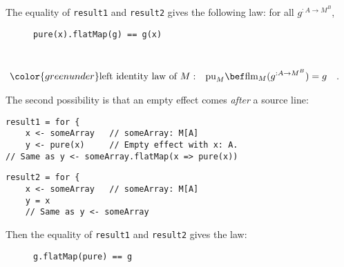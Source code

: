 \noindent \vspace{0.1\baselineskip}
The equality of \lstinline!result1! and \lstinline!result2! gives
the following law: for all $g^{:A\rightarrow M^{B}}$,

\begin{wrapfigure}{l}{0.3\columnwidth}%
\vspace{-0.9\baselineskip}
\begin{lstlisting}
pure(x).flatMap(g) == g(x)
\end{lstlisting}
\vspace{-0.6\baselineskip}
\end{wrapfigure}%

~\vspace{-1.4\baselineskip}
\begin{align}
{\color{greenunder}\text{left identity law of }M:}\quad & \text{pu}_{M}\bef\text{flm}_{M}(g^{:A\rightarrow M^{B}})=g\quad.\label{eq:monad-left-identity-law-for-flatMap}
\end{align}
\vspace{-1.2\baselineskip}

The second possibility is that an empty effect comes \emph{after}
a source line:

\noindent \texttt{\textcolor{blue}{\footnotesize{}}}%
\begin{minipage}[c]{0.475\columnwidth}%
\texttt{\textcolor{blue}{\footnotesize{}}}
\begin{lstlisting}
result1 = for {
    x <- someArray   // someArray: M[A]
    y <- pure(x)     // Empty effect with x: A.
// Same as y <- someArray.flatMap(x => pure(x))
\end{lstlisting}
%
\end{minipage}\texttt{\textcolor{blue}{\footnotesize{}\hspace*{\fill}}}%
\begin{minipage}[c]{0.475\columnwidth}%
\texttt{\textcolor{blue}{\footnotesize{}}}
\begin{lstlisting}
result2 = for {
    x <- someArray   // someArray: M[A]
    y = x
    // Same as y <- someArray
\end{lstlisting}
%
\end{minipage}{\footnotesize\par}

\noindent \vspace{0.1\baselineskip}
Then the equality of \lstinline!result1! and \lstinline!result2!
gives the law:

\begin{wrapfigure}{l}{0.3\columnwidth}%
\vspace{-0.85\baselineskip}
\begin{lstlisting}
g.flatMap(pure) == g
\end{lstlisting}
\vspace{-0.6\baselineskip}
\end{wrapfigure}%

